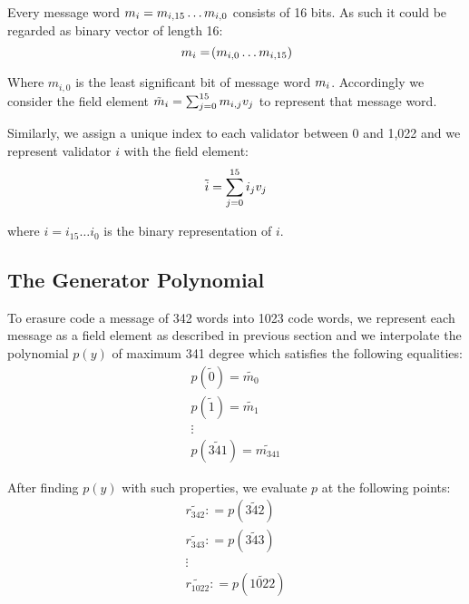 Every message word $m_{i}=m_{i, 15} \ldots m_{i, 0}$ consists of 16 bits. As such it could be regarded as binary vector of length 16:
\begin{equation}
m\sub{i} = \tup{m\sub{i, 0} \ldots m\sub{i, 15}}
\end{equation}

Where $m_{i, 0}$ is the least significant bit of message word $m_{i}$. Accordingly we consider the field element $\tilde{m}_{i} = \sum^{15}_{j = 0} m_{i, j} v_{j}$ to represent that message word.

Similarly, we assign a unique index to each validator between 0 and 1,022 and we represent validator $i$ with the field element:
\begin{equation}
\tilde{i} = \sum^{15}_{j = 0} i_{j} v_{j}
\end{equation}

where $i = i_{15} \ldots i_0$ is the binary representation of $i$.

\subsection{The Generator Polynomial}

To erasure code a message of 342 words into 1023 code words, we represent each message as a field element as described in previous section and we interpolate the polynomial $p(y)$ of maximum 341 degree which satisfies the following equalities:
\begin{equation}
   \begin{array}{l}
     p (\tilde{0}) = \widetilde{m_0}\\
     p (\tilde{1}) = \widetilde{m_1}\\
     \vdots\\
     p (\widetilde{341}) = \widetilde{m_{341}}
   \end{array}
\end{equation}

After finding $p(y)$ with such properties, we evaluate $p$ at the following points:
\begin{equation}
   \begin{array}{l}
     \widetilde{r_{342}} : = p (\widetilde{342})\\
     \widetilde{r_{343}} : = p (\widetilde{343})\\
     \vdots\\
     \widetilde{r_{1022}} : = p (\widetilde{1022})
   \end{array}
\end{equation}

